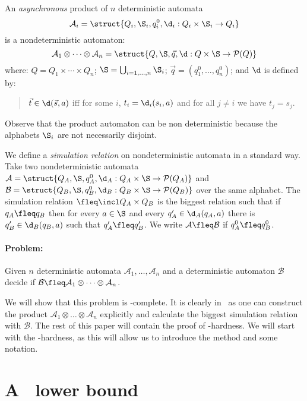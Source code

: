 \documentclass{LMCS}
\theoremstyle{plain}\newtheorem{remark}{Remark}
\theoremstyle{plain}\newtheorem{lemma}[thm]{Lemma}
\renewcommand{\Aa}{\mathcal{A}}
\renewcommand{\Bb}{\mathcal{B}}
\renewcommand{\Pp}{\mathcal{P}}
\begin{document}
An \emph{asynchronous} product of $n$ deterministic automata 
\begin{equation*}
\Aa_i=\struct{Q_i,\S_i,q^0_i,\d_i :Q_i\times\S_i\to Q_i}  
\end{equation*}
 is a nondeterministic automaton:
\begin{equation*}
  \Aa_1\otimes\dots\otimes\Aa_n=\struct{Q,\S,\vec{q},\d: Q \times \S \to \Pp(Q)}
\end{equation*}
where: $Q= Q_1\times\cdots \times Q_n$; $\S=\bigcup_{i=1,\dots,n} \S_i$; 
$\vec{q}=(q^0_1,\dots,q^0_n)$; and $\d$ is defined by:
\begin{quote}
  $\vec t\in \d(\vec s,a)$ iff for some $i$, $t_i=\d_i(s_i,a)$ and for all 
  $j\not=i$ 
  we have $t_j=s_j$.
\end{quote}

Observe that the product automaton can be non deterministic because the alphabets $\S_i$ are not necessarily disjoint.

We define a \emph{simulation relation} on nondeterministic automata in
a standard way. Take two nondeterministic automata
$\Aa=\struct{Q_A,\S,q^0_A,\d_A:Q_A\times\S\to\Pp(Q_A)}$ and
$\Bb=\struct{Q_B,\S,q^0_B,\d_B:Q_B\times\S\to\Pp(Q_B)}$ over the same
alphabet. The simulation relation $\fleq\incl Q_A\times Q_B$ is the
biggest relation such that if $q_A\fleq q_B$ then for every $a\in \S$
and every $q'_A\in\d_A(q_A,a)$ there is $q'_B\in\d_B(q_B,a)$ such that
$q'_A\fleq q'_B$. We write $\Aa\fleq \Bb$ if $q^0_A\fleq q^0_B$.

\paragraph{Problem:} Given $n$ deterministic automata
$\Aa_1,\dots,\Aa_n$ and a deterministic automaton $\Bb$ decide if
$\Bb \fleq \Aa_1\otimes\dots\otimes\Aa_n$.

We will show that this problem is \EXPTIME-complete. It is clearly in
\EXPTIME\ as one can construct the product $\Aa_1\otimes\dots\otimes\Aa_n$
explicitly and calculate the biggest simulation relation with
$\Bb$. The rest of this paper will contain the proof of
\EXPTIME-hardness. We will start with the \PSPACE-hardness, as this will
allow us to introduce the method and some notation.

\section{A \PSPACE\  lower bound}
\end{document}
